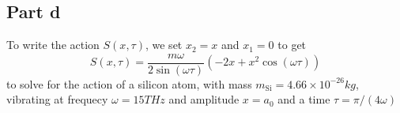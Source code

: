 \documentclass[12pt]{report}
\begin{document}
\subsection*{Part d}
To write the action $S(x,\tau)$, we set $x_2 = x$ and $x_1 = 0$ to get 
\begin{equation*}
  S(x,\tau) = \frac{m\omega}{2\sin(\omega \tau)}(-2x + x^2\cos(\omega \tau))
\end{equation*}
to solve for the action of a silicon atom, with mass $m_{\text{Si}} = 4.66 \times 10^{-26} \si{kg}$, vibrating at frequecy $\omega = 15\si{THz}$ and amplitude $x = a_0$ and a time $\tau = \pi/(4\omega)$
\end{document}

